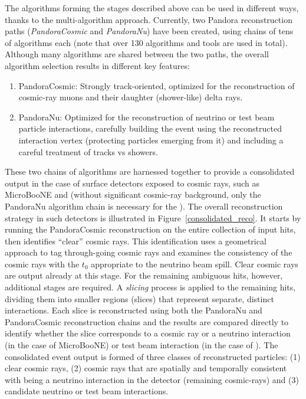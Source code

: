 The algorithms forming the stages described above can be used in different ways, thanks to the multi-algorithm approach. Currently, two Pandora reconstruction paths ({\it PandoraCosmic} and {\it PandoraNu}) have been created, using chains of tens of algorithms each (note that over 130 algorithms and tools are used in total). Although many algorithms are shared between the two paths, the overall algorithm selection results in different key features:
\begin{enumerate}
\item PandoraCosmic: Strongly track-oriented, optimized for the reconstruction of cosmic-ray muons and their daughter (shower-like) delta rays. 
\item PandoraNu: Optimized for the reconstruction of neutrino or test beam particle interactions, carefully building the event using the reconstructed interaction vertex (protecting particles emerging from it) and including a careful treatment of tracks vs showers. 
\end{enumerate}

These two chains of algorithms are harnessed together to provide a consolidated output in the case of surface detectors exposed to cosmic rays, such as MicroBooNE and  (without significant cosmic-ray background, only the PandoraNu algorithm chain is necessary for the ). The overall reconstruction strategy in such detectors is illustrated in Figure~\ref{consolidated_reco}. It starts by running the PandoraCosmic reconstruction on the entire collection of input hits, then identifies ``clear'' cosmic rays. This identification uses a geometrical approach to tag through-going cosmic rays and examines the consistency of the cosmic rays with the $t_{0}$ appropriate to the neutrino beam spill. Clear cosmic rays are output already at this stage. For the remaining ambiguous hits, however, additional stages are required. A \textit{slicing} process is applied to the remaining hits, dividing them into smaller regions (slices) that represent separate, distinct interactions. Each slice is reconstructed using both the PandoraNu and PandoraCosmic reconstruction chains and the results are compared directly to identify whether the slice corresponds to a cosmic ray or a neutrino interaction (in the case of MicroBooNE) or test beam interaction (in the case of ). The consolidated event output is formed of three classes of reconstructed particles: (1) clear cosmic rays, (2) cosmic rays that are spatially and temporally consistent with being a neutrino interaction in the detector (remaining cosmic-rays) and (3) candidate neutrino or test beam interactions.

